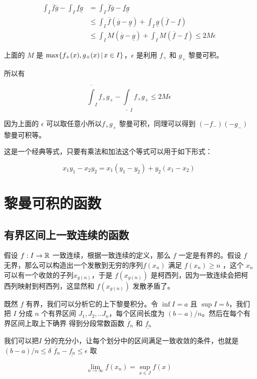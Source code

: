 \begin{align*}
    \int_{I}\overline{f}\overline{g} - \int_{I}\underline{f}\underline{g} &= \int_{I}\overline{f}\overline{g} - \underline{f}\underline{g} \\
    & \le \int_{I}\overline{f}(\overline{g} - \underline{g}) + \int_{I}\underline{g}(\overline{f} - \underline{f})  \\
    & \le \int_{I}M(\overline{g} - \underline{g}) + \int_{I}M(\overline{f} - \underline{f}) \le 2M\epsilon
\end{align*}

上面的 $M$ 是 $\max \{ f_{+}(x), g_{+}(x) \,\vert\, x \in I \}$，$\epsilon$ 是利用 $f_{+}$ 和 $g_{+}$ 黎曼可积。

所以有 

\[
    \overline{\int}_{I}f_{+}g_{+} - \underline{\int}_{I}f_{+}g_{+} \le 2 M \epsilon
\]

因为上面的 $\epsilon$ 可以取任意小所以$f_{+}g_{+}$ 黎曼可积，同理可以得到 $(-f_{-})(-g_{-})$ 黎曼可积等。

这是一个经典等式，只要有乘法和加法这个等式可以用于如下形式：

\[
    x_1y_1 - x_2y_2 = x_1(y_1 - y_2) + y_2(x_1 - x_2)
\]

\section{黎曼可积的函数}

\subsection{有界区间上一致连续的函数}

假设 $f: I \to \mathbb{R}$ 一致连续，根据一致连续的定义，那么 $f$ 一定是有界的。假设 $f$ 无界，那么可以构造出一个发散到无穷的序列$f(x_n)$ 满足 $f(x_n) \ge n$
，这个 $x_n$ 可以有一个收敛的子列$x_{g(n)}$，于是 $f(x_{g(n)})$ 是柯西列，因为一致连续会把柯西列映射到柯西列，这显然和 $f(x_{g(n)})$ 发散矛盾了。

既然 $f$ 有界，我们可以分析它的上下黎曼积分。令 $\inf I =a$ 且 $\sup I = b$，我们把 $I$ 分成 $n$ 个有界区间 $J_1, J_2, .. J_n$，每个区间长度为 $(b-a)/n$。然后在每个有界区间上取上下确界
得到分段常数函数 $\overline{f}_n$ 和 $\underline{f_n}$ 

我们可以把$I$ 分的充分小，让每个划分中的区间满足一致收敛的条件，也就是 $(b-a)/n \le \delta$ $\overline{f}_n - \underline{f_n} \le \epsilon$
取 

\[
\lim_{n \to \infty}f(x_n) = \sup_{x \in J}f(x)
\]


